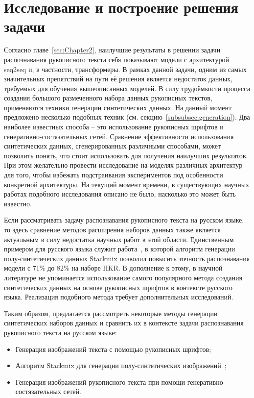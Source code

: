 \section{Исследование и построение решения задачи}
\label{sec:Chapter3} 

Согласно главе~\ref{sec:Chapter2}, наилучшие результаты в решении задачи распознавания рукописного текста себя показывают
модели с архитектурой seq2seq и, в частности, трансформеры.
В рамках данной задачи, одним из самых значительных препятствий на пути её решения является недостаток данных,
требуемых для обучения вышеописанных моделей.
В силу трудоёмкости процесса создания большого размеченного набора данных рукописных текстов, применяются техники генерации синтетических данных.
На данный момент предложено несколько подобных техник (см. секцию~\ref{subsubsec:generation}).
Два наиболее известных способа -- это использование рукописных шрифтов и генеративно-состязательных сетей.
Сравнение эффективности использования синтетических данных, сгенерированных различными способами, может позволить понять,
что стоит использовать для получения наилучших результатов.
При этом желательно провести исследование на моделях различных архитектур для того, чтобы избежать
подстраивания экспериментов под особенности конкретной архитектуры.
На текущий момент времени, в существующих научных работах подобного исследования описано не было, насколько это может быть известно.

Если рассматривать задачу распознавания рукописного текста на русском языке,
то здесь сравнение методов расширения наборов данных также является актуальным в силу недостатка научных работ в этой области.
Единственным примером для русского языка служит работа~\cite{shonenkov2021stackmix},
в которой алгоритм генерации полу-синтетических данных Stackmix позволил повысить точность распознавания модели с 71\% до 82\% на наборе HKR.
В дополнение к этому, в научной литературе не упоминается использование самого популярного метода создания синтетических данных
на основе рукописных шрифтов в контексте русского языка.
Реализация подобного метода требует дополнительных исследований.

Таким образом, предлагается рассмотреть некоторые методы генерации синтетических наборов данных и сравнить их в контексте
задачи распознавания рукописного текста на русском языке:
\begin{itemize}
    \item Генерация изображений текста с помощью рукописных шрифтов;
    \item Алгоритм Stackmix для генерации полу-синтетических изображений~\cite{shonenkov2021stackmix};
    \item Генерация изображений рукописного текста при помощи генеративно-состязательных сетей.
\end{itemize}

